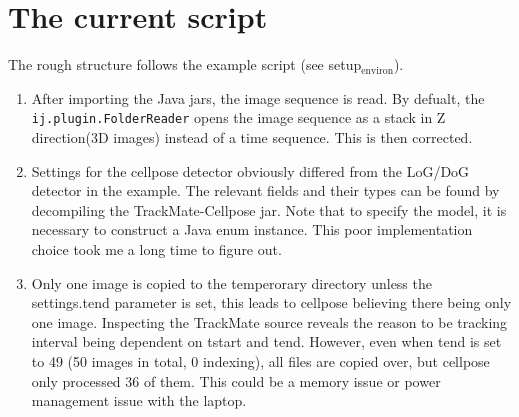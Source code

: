 \documentclass[11pt]{article}
\begin{document}
\section{The current script}
\label{sec:orge6052b0}
The rough structure follows the example script (see setup\(_{\text{environ}}\)).
\begin{enumerate}
\item After importing the Java jars, the image sequence is read. By defualt, the \texttt{ij.plugin.FolderReader} opens the image sequence as a stack in Z direction(3D images) instead of a time sequence. This is then corrected.
\item Settings for the cellpose detector obviously differed from the LoG/DoG detector in the example. The relevant fields and their types can be found by decompiling the TrackMate-Cellpose jar. Note that to specify the model, it is necessary to construct a Java enum instance. This poor implementation choice took me a long time to figure out.
\item Only one image is copied to the temperorary directory unless the settings.tend parameter is set, this leads to cellpose believing there being only one image. Inspecting the TrackMate source reveals the reason to be tracking interval being dependent on tstart and tend. However, even when tend is set to 49 (50 images in total, 0 indexing), all files are copied over, but cellpose only processed 36 of them. This could be a memory issue or power management issue with the laptop.
\end{enumerate}
\end{document}
